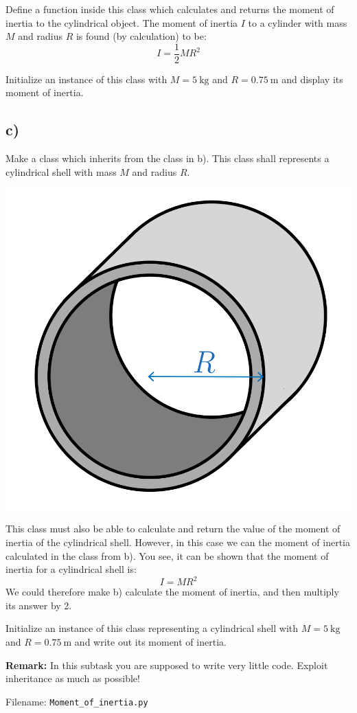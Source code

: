 \documentclass[10pt,a4paper]{article}
\begin{document}
Define a function inside this class which calculates and returns the moment of inertia to the cylindrical object. The moment of inertia $I$ to a cylinder with mass $M$ and radius $R$ is found (by calculation) to be:
\[
I = \frac{1}{2}MR^2
\] 

Initialize an instance of this class with $M = \SI{5}{\kg}$ and $R = \SI{0.75}{\meter}$ and display its moment of inertia. 
\subsection*{c)}
Make a class which inherits from the class in b). This class shall represents a cylindrical shell with mass $M$ and radius $R$. 
\begin{center}
	\includegraphics[scale=.5]{fig_sylinderskall-cp1.png}
\end{center}

This class must also be able to calculate and return the value of the moment of inertia of the cylindrical shell. However, in this case we can the moment of inertia calculated in the class from b). You see, it can be shown that the moment of inertia for a cylindrical shell is:
\[
I = MR^2
\]
We could therefore make b) calculate the moment of inertia, and then multiply its answer by 2. 

Initialize an instance of this class representing a cylindrical shell with $M = \SI{5}{\kg}$ and $R = \SI{0.75}{\meter}$ and write out its moment of inertia. 

\textbf{Remark:} In this subtask you are supposed to write very little code. Exploit inheritance as much as possible!

Filename: \texttt{Moment\_of\_inertia.py}
\end{document}
